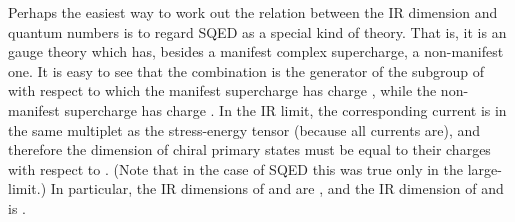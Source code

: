 \documentclass[a4paper,12pt, amsfonts, amssymb]{article}
\providecommand{\tQ}{{\tilde Q}}
\begin{document}
Perhaps the easiest way to work out the relation
between the IR dimension and \coordHE{} quantum numbers
is to regard \coordHE{} SQED as a special kind of \coordHE{} theory. That is, it
is an \coordHE{} gauge theory which has, besides a manifest complex supercharge,
a non-manifest one. It is easy to
see that the combination \coordHE{} is the generator of
the \coordHE{} subgroup of \coordHE{} with respect to which 
the manifest supercharge has charge \coordHE{}, 
while the non-manifest supercharge has charge \coordHE{}. In the IR limit, the corresponding current is in the
same multiplet as the stress-energy tensor (because all \coordHE{}
currents are), and therefore the dimension of chiral primary states
must be equal to their charges with respect to \coordHE{}. (Note
that in the case of \coordHE{} SQED this was true only in the large-\coordHE{}
limit.) In particular, the IR dimensions of \coordHE{} and \myHighlight{$\tQ_j$}\coordHE{} are
\coordHE{}, and the IR dimension of \myHighlight{$\Phi$}\coordHE{} and \myHighlight{$\chi$}\coordHE{} is \coordHE{}. 
\end{document}
